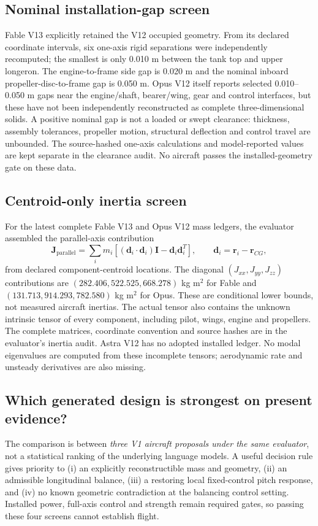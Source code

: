 \documentclass[10pt,letterpaper]{article}
\begin{document}
\subsection{Nominal installation-gap screen}
Fable V13 explicitly retained the V12 occupied geometry. From its declared
coordinate intervals, six one-axis rigid separations were independently
recomputed; the smallest is only 0.010 m between the tank top and upper
longeron. The engine-to-frame side gap is 0.020 m and the nominal inboard
propeller-disc-to-frame gap is 0.050 m. Opus V12 itself reports selected
0.010--0.050 m gaps near the engine/shaft, bearer/wing, gear and control
interfaces, but these have not been independently reconstructed as complete
three-dimensional solids. A positive nominal gap is not a loaded or swept
clearance: thickness, assembly tolerances, propeller motion, structural
deflection and control travel are unbounded. The source-hashed one-axis
calculations and model-reported values are kept separate in the clearance
audit. No aircraft passes the installed-geometry gate on these data.

\subsection{Centroid-only inertia screen}
For the latest complete Fable V13 and Opus V12 mass ledgers, the evaluator
assembled the parallel-axis contribution
\begin{equation}\label{eq:parallelaxis}
\mathbf J_{\mathrm{parallel}}=\sum_i m_i
\left[(\mathbf d_i\cdot\mathbf d_i)\mathbf I-\mathbf d_i\mathbf d_i^T\right],
\qquad \mathbf d_i=\mathbf r_i-\mathbf r_{CG},
\end{equation}
from declared component-centroid locations. The diagonal $(J_{xx},J_{yy},
J_{zz})$ contributions are $(282.406,522.525,668.278)$ kg m$^2$ for Fable
and $(131.713,914.293,782.580)$ kg m$^2$ for Opus. These are conditional
lower bounds, not measured aircraft inertias. The actual tensor also contains
the unknown intrinsic tensor of every component, including pilot, wings,
engine and propellers. The complete matrices, coordinate convention and
source hashes are in the evaluator's inertia audit. Astra V12 has no adopted
installed ledger. No modal eigenvalues are computed from these incomplete
tensors; aerodynamic rate and unsteady derivatives are also missing.

\subsection{Which generated design is strongest on present evidence?}
The comparison is between \emph{three V1 aircraft proposals under the same evaluator}, not a statistical ranking of the underlying language models. A useful decision rule gives priority to (i) an explicitly reconstructible mass and geometry, (ii) an admissible longitudinal balance, (iii) a restoring local fixed-control pitch response, and (iv) no known geometric contradiction at the balancing control setting. Installed power, full-axis control and strength remain required gates, so passing these four screens cannot establish flight.
\end{document}
